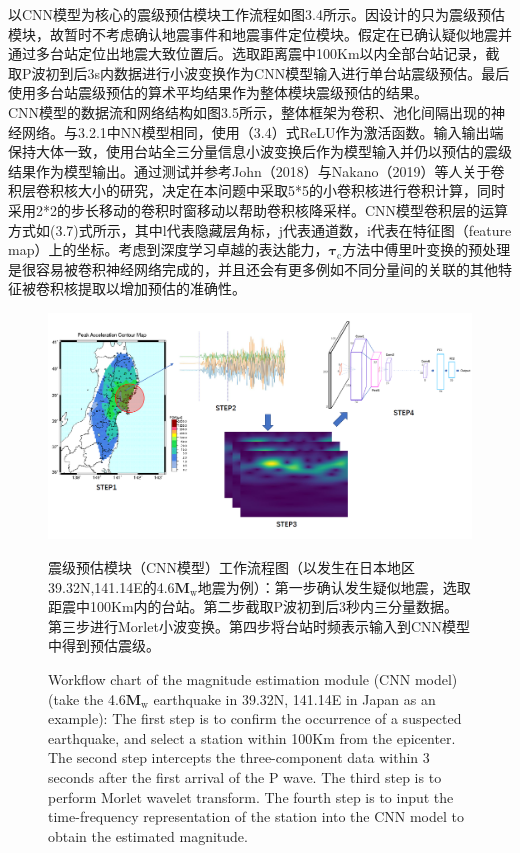 \indent 以CNN模型为核心的震级预估模块工作流程如图3.4所示。因设计的只为震级预估模块，故暂时不考虑确认地震事件和地震事件定位模块。假定在已确认疑似地震并通过多台站定位出地震大致位置后。选取距离震中100Km以内全部台站记录，截取P波初到后3s内数据进行小波变换作为CNN模型输入进行单台站震级预估。最后使用多台站震级预估的算术平均结果作为整体模块震级预估的结果。\\
\indent CNN模型的数据流和网络结构如图3.5所示，整体框架为卷积、池化间隔出现的神经网络。与3.2.1中NN模型相同，使用（3.4）式ReLU作为激活函数。输入输出端保持大体一致，使用台站全三分量信息小波变换后作为模型输入并仍以预估的震级结果作为模型输出。通过测试并参考John（2018）与Nakano（2019）等人关于卷积层卷积核大小的研究，决定在本问题中采取5*5的小卷积核进行卷积计算，同时采用2*2的步长移动的卷积时窗移动以帮助卷积核降采样。CNN模型卷积层的运算方式如(3.7)式所示，其中l代表隐藏层角标，j代表通道数，i代表在特征图（feature map）上的坐标。考虑到深度学习卓越的表达能力，$\mathbf{\tau}_{\mathrm{c}}$方法中傅里叶变换的预处理是很容易被卷积神经网络完成的，并且还会有更多例如不同分量间的关联的其他特征被卷积核提取以增加预估的准确性。\\
\begin{figure}[h] 
\centering 
 \includegraphics[width=1.0\linewidth]{img/Flow.jpg} 
 \renewcommand{\figurename}{图} 
\caption{震级预估模块（CNN模型）工作流程图（以发生在日本地区39.32N,141.14E的4.6$\mathbf{M}_{\mathrm{w}}$地震为例）：第一步确认发生疑似地震，选取距震中100Km内的台站。第二步截取P波初到后3秒内三分量数据。第三步进行Morlet小波变换。第四步将台站时频表示输入到CNN模型中得到预估震级。} 
\addtocounter{figure}{-1} \vspace{-5pt} 
\renewcommand{\figurename}{Fig} 
\caption{Workflow chart of the magnitude estimation module (CNN model) (take the 4.6$\mathbf{M}_{\mathrm{w}}$ earthquake in 39.32N, 141.14E in Japan as an example): The first step is to confirm the occurrence of a suspected earthquake, and select a station within 100Km from the epicenter. The second step intercepts the three-component data within 3 seconds after the first arrival of the P wave. The third step is to perform Morlet wavelet transform. The fourth step is to input the time-frequency representation of the station into the CNN model to obtain the estimated magnitude.} 
\renewcommand{\figurename}{图} 
\label{fig:network-device-influence.png} 
\end{figure}
